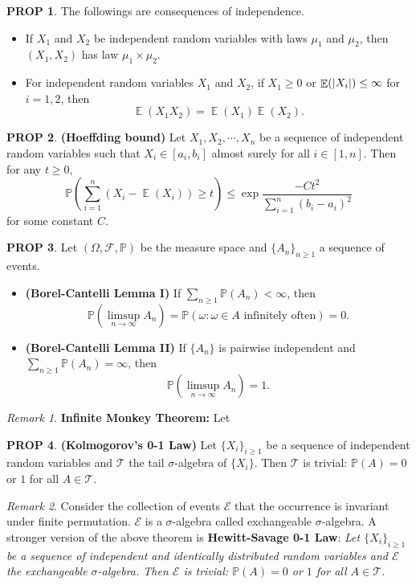 \documentclass[hidelinks,11pt]{article}
\theoremstyle{definition}
\theoremstyle{dotless}
\newtheorem{prop}{PROP}[section]
\theoremstyle{remark}
\newtheorem*{remark}{Remark}
\DeclareMathOperator{\E}{\mathbb{E}}
\DeclareMathOperator{\1}{\mathbf{1}}
\begin{document}
\begin{prop}
The followings are consequences of independence.\begin{itemize}
    \item If $X_1$ and $X_2$ be independent random variables with laws $\mu_1$ and $\mu_2$, then $(X_1,X_2)$ has law $\mu_1\times\mu_2$.
    \item For independent random variables $X_1$ and $X_2$, if $X_1\geq0$ or $\E(\abs{X_i})\leq\infty$ for $i=1,2$, then
    \[\E(X_1X_2)=\E(X_1)\E(X_2).\]
\end{itemize}
\end{prop}

\begin{prop}\textup{\textbf{(Hoeffding bound)}} Let $X_1,X_2,\cdots,X_n$ be a sequence of independent random variables such that $X_i\in[a_i,b_i]$ almost surely for all $i\in[1,n]$. Then for any $t\geq0$,
\[\mathbb{P}\left(\sum_{i=1}^n(X_i-\E(X_i))\geq t\right)\leq\exp{\frac{-Ct^2}{\sum_{i=1}^n(b_i-a_i)^2}}\]
for some constant $C$.
\end{prop}

\begin{prop}Let $(\Omega,\mathcal{F},\mathbb{P})$ be the measure space and $\{A_n\}_{n\geq1}$ a sequence of events.\begin{itemize}
    \item\textup{\textbf{(Borel-Cantelli Lemma I)}} If $\sum_{n\geq1}\mathbb{P}(A_n)<\infty$, then
\[\mathbb{P}(\limsup_{n\to\infty}A_n)=\mathbb{P}(\omega:\omega\in A\textrm{ infinitely often})=0.\]
    \item\textup{\textbf{(Borel-Cantelli Lemma II)}} If $\{A_n\}$ is pairwise independent and $\sum_{n\geq1}\mathbb{P}(A_n)=\infty$, then
    \[\mathbb{P}(\limsup_{n\to\infty}A_n)=1.\]
\end{itemize}
\end{prop}

\begin{remark}\textup{\textbf{Infinite Monkey Theorem:}} Let
\end{remark}

\begin{prop}\textup{\textbf{(Kolmogorov's 0-1 Law)}} Let $\{X_i\}_{i\geq1}$ be a sequence of independent random variables and $\mathcal{T}$ the tail $\sigma$-algebra of $\{X_i\}$. Then $\mathcal{T}$ is trivial: $\mathbb{P}(A)=0$ or $1$ for all $A\in\mathcal{T}$.
\end{prop}

\begin{remark}
Consider the collection of events $\mathcal{E}$ that the occurrence is invariant under finite permutation. $\mathcal{E}$ is a $\sigma$-algebra called exchangeable $\sigma$-algebra. A stronger version of the above theorem is \textbf{Hewitt-Savage 0-1 Law}:\medbreak
\textit{Let $\{X_i\}_{i\geq1}$ be a sequence of independent and identically distributed random variables and $\mathcal{E}$ the exchangeable $\sigma$-algebra. Then $\mathcal{E}$ is trivial: $\mathbb{P}(A)=0$ or $1$ for all $A\in\mathcal{T}$.}
\end{remark}
\end{document}
